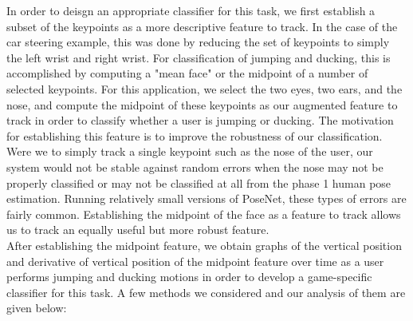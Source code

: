 \documentclass[10pt,twocolumn,letterpaper]{article}
\begin{document}
In order to deisgn an appropriate classifier for this task, we first establish 
a subset of the keypoints as a more descriptive feature to track. In the case of 
the car steering example, this was done by reducing the set of keypoints to simply 
the left wrist and right wrist. For classification of jumping and ducking, this is 
accomplished by computing a "mean face" or the midpoint of a number of selected 
keypoints. For this application, we select the two eyes, two ears, and the nose, 
and compute the midpoint of these keypoints as our augmented feature to track in 
order to classify whether a user is jumping or ducking. The motivation for establishing 
this feature is to improve the robustness of our classification. Were we to simply 
track a single keypoint such as the nose of the user, our system would not be 
stable against random errors when the nose may not be properly classified or 
may not be classified at all from the phase 1 human pose estimation. Running 
relatively small versions of PoseNet, these types of errors are fairly common. 
Establishing the midpoint of the face as a feature to track allows us to track 
an equally useful but more robust feature.\\

After establishing the midpoint feature, we obtain graphs of the vertical 
position and derivative of vertical position of the midpoint feature over time 
as a user performs jumping and ducking motions in order to develop a game-specific 
classifier for this task. A few methods we considered and our analysis of them 
are given below:
\end{document}
